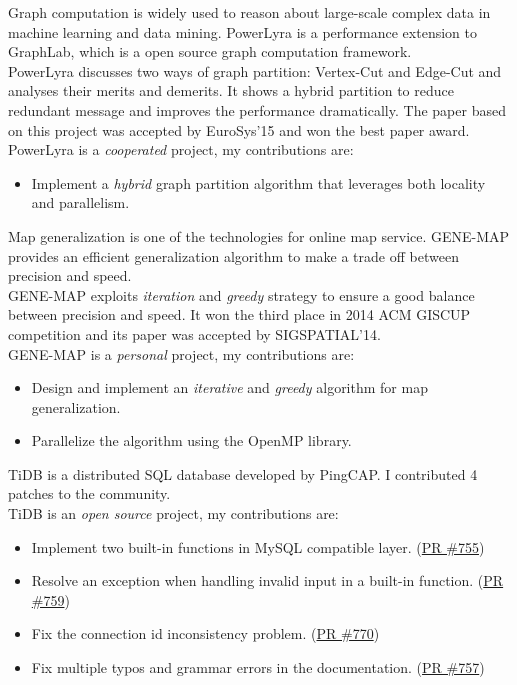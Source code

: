 \documentclass{resume}
\begin{document}
Graph computation is widely used to reason about large-scale complex data in machine learning and data mining. PowerLyra is a performance extension to GraphLab, which is a open source graph computation framework.
\\[5pt]
PowerLyra discusses two ways of graph partition: Vertex-Cut and Edge-Cut and analyses their merits and demerits. It shows a hybrid partition to reduce redundant message and improves the performance dramatically. The paper based on this project was accepted by EuroSys’15 and won the best paper award.
\\[5pt]
PowerLyra is a \textit{cooperated} project, my contributions are:
\begin{itemize}
  \item {Implement a \textit{hybrid} graph partition algorithm that leverages both locality and parallelism.}
\end{itemize}

Map generalization is one of the technologies for online map service. GENE-MAP provides an efficient generalization algorithm to make a trade off between precision and speed.
\\[5pt]
GENE-MAP exploits \textit{iteration} and \textit{greedy} strategy to ensure a good balance between precision and speed. It won the third place in 2014 ACM GISCUP competition and its paper was accepted by SIGSPATIAL’14.
\\[5pt]
GENE-MAP is a \textit{personal} project, my contributions are:
\begin{itemize}
  \item {Design and implement an \textit{iterative} and \textit{greedy} algorithm for map generalization.}
  \item {Parallelize the algorithm using the OpenMP library.}
\end{itemize}

TiDB is a distributed SQL database developed by PingCAP. I contributed 4 patches to the community.
\\[5pt]
TiDB is an \textit{open source} project, my contributions are:
\begin{itemize}
  \item {Implement two built-in functions in MySQL compatible layer.} (\href{https://github.com/pingcap/tidb/pull/755}{PR \#755})
  \item {Resolve an exception when handling invalid input in a built-in function.} (\href{https://github.com/pingcap/tidb/pull/759}{PR \#759})
  \item {Fix the connection id inconsistency problem.} (\href{https://github.com/pingcap/tidb/pull/770}{PR \#770})
  \item {Fix multiple typos and grammar errors in the documentation.} (\href{https://github.com/pingcap/tidb/pull/757}{PR \#757})
\end{itemize}
\end{document}
